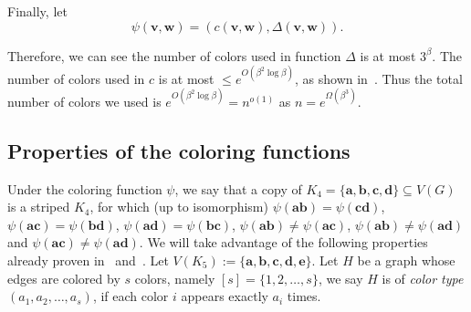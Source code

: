 \documentclass[11pt]{article}
\theoremstyle{definition}
\newcommand{\aaa}{\boldsymbol{a}}
\newcommand{\bb}{\boldsymbol{b}}
\newcommand{\cc}{\boldsymbol{c}}
\newcommand{\dd}{\boldsymbol{d}}
\newcommand{\ee}{\boldsymbol{e}}
\begin{document}
Finally, let
\begin{equation*}
   \psi(\boldsymbol{v},\boldsymbol{w})=(c(\boldsymbol{v},\boldsymbol{w}),\Delta(\boldsymbol{v},\boldsymbol{w})). 
\end{equation*}

Therefore, we can see the number of colors used in function $\Delta$ is at most $3^{\beta}$. The number of colors used in $c$ is at most $\le e^{O(\beta^{2}\log{\beta})}$, as shown in~\cite{2015PLMSCFLS}. Thus the total number of colors we used is $e^{O(\beta^{2}\log{\beta})}=n^{o(1)}$ as $n=e^{\Omega(\beta^{3})}$.


\subsection{Properties of the coloring functions}




Under the coloring function $\psi$, we say that a copy of $K_{4}=\{\aaa,\bb,\cc,\dd\}\subseteq V(G)$ is a striped $K_{4}$, for which (up to isomorphism) $\psi(\aaa\bb)=\psi(\cc\dd)$, $\psi(\aaa\cc)=\psi(\bb\dd)$, $\psi(\aaa\dd)=\psi(\bb\cc)$, $\psi(\aaa\bb)\neq \psi(\aaa\cc)$, $\psi(\aaa\bb)\neq \psi(\aaa\dd)$ and $\psi(\aaa\cc)\neq \psi(\aaa\dd)$.
We will take advantage of the following properties already proven in~\cite{2018CPC55} and~\cite{2023CPC6688}. Let $V(K_{5}):=\{\aaa,\bb,\cc,\dd,\ee\}$. Let $H$ be a graph whose edges are colored by $s$ colors, namely $[s]=\{1,2,\ldots,s\}$, we say $H$ is of \emph{color type} $(a_{1},a_{2},\ldots,a_{s})$, if each color $i$ appears exactly $a_{i}$ times.
\end{document}
